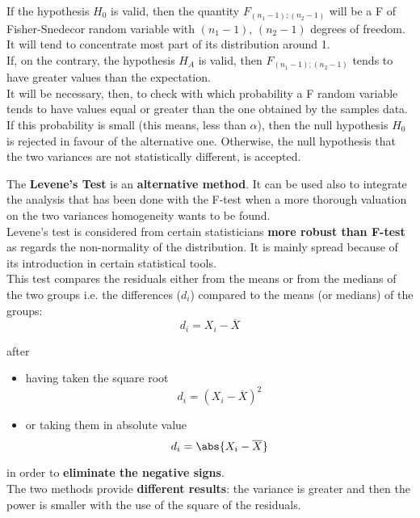 \begin{frame}
  \vspace*{.25cm}
  If the hypothesis $ H_0 $ is valid, then the quantity $ F_{(n_1-1);(n_2-1)} $ will be a F of Fisher-Snedecor random variable with $ (n_1-1),\,(n_2-1) $ degrees of freedom. It will tend to concentrate most part of its distribution around 1.\\
  \vspace*{.25cm}
  If, on the contrary, the hypothesis $ H_A $ is valid, then $ F_{(n_1-1);(n_2-1)} $ tends to have greater values than the expectation.\\
  \vspace*{.25cm}
  It will be necessary, then, to check with which probability a F random variable tends to have values equal or greater than the one obtained by the samples data. If this probability is small (this means, less than $ \alpha $), then the null hypothesis $ H_0 $ is rejected in favour of the alternative one. 
  Otherwise, the null hypothesis that the two variances are not statistically different, is accepted.
\end{frame}


\begin{frame}
  \vspace*{.25cm}
  The \textbf{Levene's Test} is an \textbf{alternative method}. It can be used also to integrate the analysis that has been done with the F-test when a more thorough valuation on the two variances homogeneity wants to be found.\\
  \vspace*{.25cm}
  Levene's test is considered from certain statisticians \textbf{more robust than F-test} as regards the non-normality of the distribution. It is mainly spread because of its introduction in certain statistical tools.\\
  \vspace*{.25cm}
  This test compares the residuals either from the means or from the medians of the two groups i.e. the differences ($ d_i $) compared to the means (or medians) of the groups:
  $$ d_i = X_i-\overline{X} $$
\end{frame}

\begin{frame}
  \vspace*{.25cm}
  after\\
  \begin{itemize}
    \item having taken the square root
    $$ d_i = (X_i - \overline{X})^2 $$
    \item or taking them in absolute value
    $$ d_i = \abs{X_i - \overline{X}} $$
  \end{itemize}
  \vspace*{.25cm}
  in order to \textbf{eliminate the negative signs}.\\
  \vspace*{.25cm}
  The two methods provide \textbf{different results}: the variance is greater and then the power is smaller with the use of the square of the residuals.
\end{frame}


